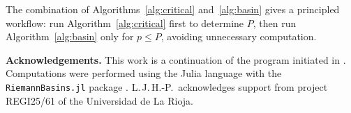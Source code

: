 \documentclass[12pt]{article}
\theoremstyle{definition}
\begin{document}
The combination of Algorithms~\ref{alg:critical} and~\ref{alg:basin} gives a
principled workflow: run Algorithm~\ref{alg:critical} first to determine $P$,
then run Algorithm~\ref{alg:basin} only for $p\leq P$, avoiding unnecessary
computation.

\bigskip
\noindent\textbf{Acknowledgements.}
This work is a continuation of the program
initiated in \cite{Extremiana2019,AlvarezAparicio2023}.  Computations were
performed using the Julia language \cite{Julia2017} with the
\texttt{RiemannBasins.jl} package \cite{RiemannBasins}.
L.\,J.\,H.-P.\ acknowledges support from project REGI25/61 of the
Universidad de La Rioja.



\end{document}
